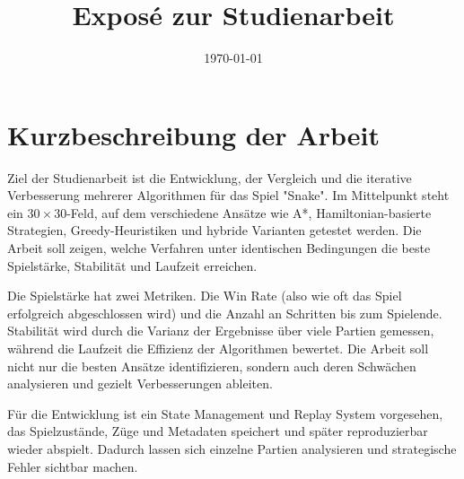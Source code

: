 \documentclass[a4paper]{scrartcl}
\title{\Large Exposé zur Studienarbeit\\\LARGE \titlename}
\author{\authorname}
\date{\today}
\newcommand{\boardsize}{30\,$\times$\,30}
\begin{document}
\maketitle

\section{Kurzbeschreibung der Arbeit}
Ziel der Studienarbeit ist die Entwicklung, der Vergleich und die iterative Verbesserung mehrerer Algorithmen für das Spiel "Snake". Im Mittelpunkt steht ein \boardsize-Feld, auf dem verschiedene Ansätze wie A*, Hamiltonian-basierte Strategien, Greedy-Heuristiken und hybride Varianten getestet werden. Die Arbeit soll zeigen, welche Verfahren unter identischen Bedingungen die beste Spielstärke, Stabilität und Laufzeit erreichen.

Die Spielstärke hat zwei Metriken. Die Win Rate (also wie oft das Spiel erfolgreich abgeschlossen wird) und die Anzahl an Schritten bis zum Spielende. Stabilität wird durch die Varianz der Ergebnisse über viele Partien gemessen, während die Laufzeit die Effizienz der Algorithmen bewertet. Die Arbeit soll nicht nur die besten Ansätze identifizieren, sondern auch deren Schwächen analysieren und gezielt Verbesserungen ableiten.

Für die Entwicklung ist ein State Management und Replay System vorgesehen, das Spielzustände, Züge und Metadaten speichert und später reproduzierbar wieder abspielt. Dadurch lassen sich einzelne Partien analysieren und strategische Fehler sichtbar machen.
\end{document}
